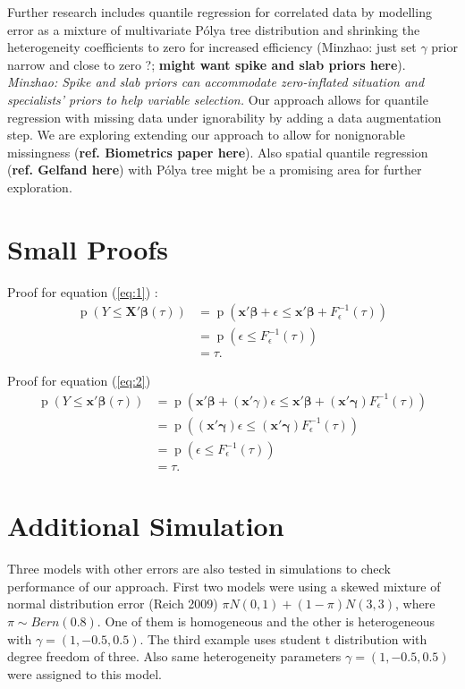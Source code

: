 \documentclass[12pt]{article}
\newcommand{\polya}{P\'{o}lya}
\DeclareMathOperator{\pr}{p}
\begin{document}
Further research includes quantile regression for correlated data by
modelling error as a mixture of multivariate \polya{} tree
distribution and 
shrinking the heterogeneity coefficients to zero for increased
efficiency  (Minzhao: just set
$\gamma$ prior narrow and  close to zero ?; {\bf might want spike and
  slab priors here}). {\it Minzhao: Spike and slab
priors can accommodate zero-inflated situation and specialists' priors
to help variable selection.} Our approach allows for
quantile
regression with missing data under ignorability by adding a data
augmentation step.  We are exploring extending our approach to allow
for nonignorable missingness ({\bf ref. Biometrics paper here}).
Also spatial quantile regression ({\bf ref. Gelfand here}) with \polya{} tree might be
a promising area for further exploration. 


% 


\appendix 
\section{Small Proofs}

Proof for equation (\ref{eq:1}) : 
\begin{align*}
  \pr (Y \le \bm{X'\beta}(\tau)) & = \pr \left( \bm{x'\beta} + \epsilon
    \le \bm{x'\beta} + F^{-1}_{\epsilon}(\tau) \right) \\
  & = \pr (\epsilon \le F^{-1}_{\epsilon}(\tau)) \\
  & = \tau. 
\end{align*}

Proof for equation (\ref{eq:2})
\begin{align*}
  \pr (Y \le \bm{x'\beta}(\tau)) & = \pr \left( \bm{x'\beta} +
    (\bm{x}'\gamma) \epsilon \le \bm{x'\beta} + (\bm{x'\gamma})
    F^{-1}_{\epsilon}(\tau) \right) \\
  & = \pr \left( (\bm{x'\gamma}) \epsilon \le  (\bm{x'\gamma})
    F^{-1}_{\epsilon}(\tau)  \right)\\
  & = \pr (\epsilon \le F^{-1}_{\epsilon}(\tau)) \\
  & = \tau .
\end{align*}

\section{Additional Simulation}

Three models with other errors are also tested in simulations to check
performance of our approach. First two models were using a skewed
mixture of normal distribution error (Reich 2009) $\pi N(0,1) +
(1-\pi) N(3,3)$, where $\pi \sim Bern(0.8)$. One of them is
homogeneous  and the other is heterogeneous with $\gamma=(1,
-0.5,0.5)$. The third example uses student t distribution with degree
freedom of three. Also same heterogeneity parameters $\gamma=(1,
-0.5,0.5)$ were assigned to this model. 
\end{document}
